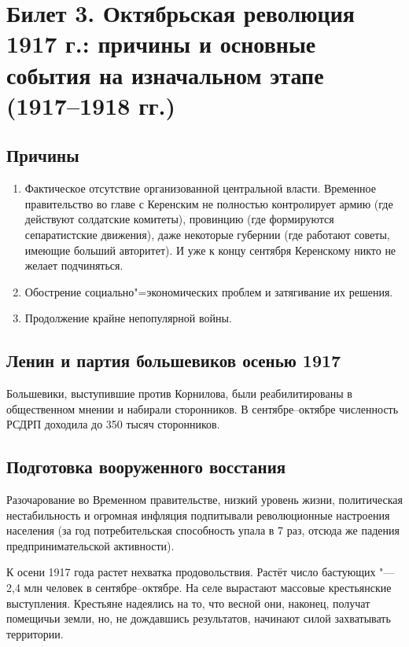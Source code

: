\section{Билет 3. Октябрьская революция 1917 г.: причины и основные события на изначальном этапе (1917--1918 гг.)}

\subsection{Причины}

\begin{enumerate}
\item Фактическое отсутствие организованной центральной власти. Временное правительство во главе с Керенским не полностью контролирует армию (где действуют солдатские комитеты), провинцию (где формируются сепаратистские движения), даже некоторые губернии (где работают советы, имеющие больший авторитет). И уже к концу сентября Керенскому никто не желает подчиняться.

\item Обострение социально"=экономических проблем и затягивание их решения.

\item Продолжение крайне непопулярной войны.
\end{enumerate}


\subsection{Ленин и партия большевиков осенью 1917}

Большевики, выступившие против Корнилова, были реабилитированы в общественном мнении и набирали сторонников. В сентябре--октябре численность РСДРП доходила до 350 тысяч сторонников.

\subsection{Подготовка вооруженного восстания}

Разочарование во Временном правительстве, низкий уровень жизни, политическая нестабильность и огромная инфляция подпитывали революционные настроения населения (за год потребительская способность упала в 7 раз, отсюда же падения предпринимательской активности).

К осени 1917 года растет нехватка продовольствия. Растёт число бастующих "--- 2,4 млн человек в сентябре--октябре. На селе вырастают массовые крестьянские выступления. Крестьяне надеялись на то, что весной они, наконец, получат помещичьи земли, но, не дождавшись результатов, начинают силой захватывать территории.

